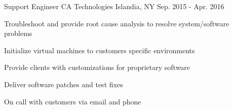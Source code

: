 \begin{cventries}

\cventry
{Support Engineer} %
{CA Technologies} %
{Islandia, NY} %
{Sep. 2015 - Apr. 2016} %
{ %
\begin{cvitems}
\item {Troubleshoot and provide root cause analysis to resolve system/software problems}
\item {Initialize virtual machines to customers specific environments}
\item {Provide clients with customizations for proprietary software}
\item {Deliver software patches and test fixes}
\item {On call with customers via email and phone}
\end{cvitems} 
}


\end{cventries}
